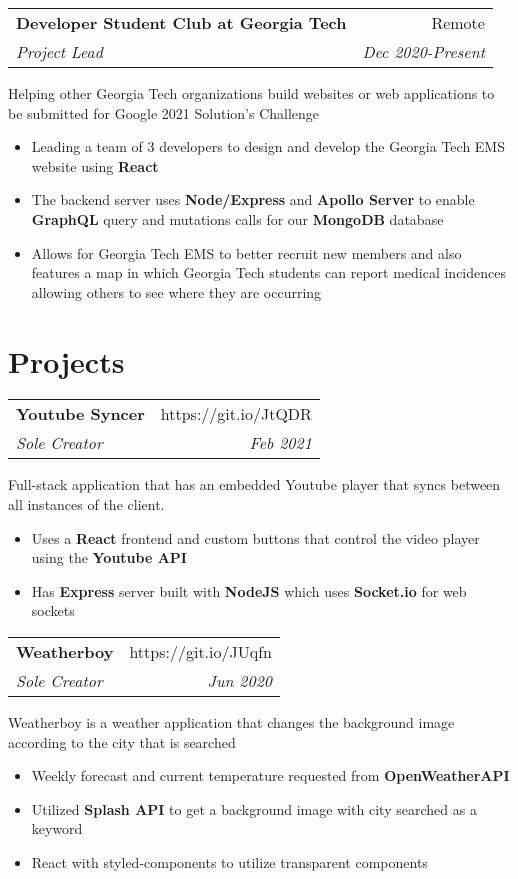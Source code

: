 \documentclass[letterpaper,8pt]{article}
\makeatletter
\newcommand{\resumeSubheading}[4]{
  \vspace{0.25em}
  \begin{tabular*}{1\textwidth}[t]{l@{\extracolsep{\fill}}r}
    \textbf{#1} & #2 \\
    \textit{#3} & \textit{#4} \\
  \end{tabular*}\vspace{-5pt}
}
\makeatother
\begin{document}
\resumeSubheading{Developer Student Club at Georgia Tech}{Remote}{Project Lead}{Dec 2020-Present}

Helping other Georgia Tech organizations build websites or web applications to be submitted for Google 2021 Solution's Challenge

\begin{itemize}[label=\raisebox{0.25ex}{\tiny$\bullet$}]
    \item Leading a team of 3 developers to design and develop the Georgia Tech EMS website using \textbf{React}
    \item The backend server uses \textbf{Node/Express} and \textbf{Apollo Server} to enable \textbf{GraphQL} query and mutations calls for our \textbf{MongoDB} database
    \item Allows for Georgia Tech EMS to better recruit new members and also features a map in which Georgia Tech students can report medical incidences allowing others to see where they are occurring
\end{itemize}
\vspace{3pt}


\section{Projects}

\resumeSubheading{Youtube Syncer}{https://git.io/JtQDR}{Sole Creator}{Feb 2021}

Full-stack application that has an embedded Youtube player that syncs between all instances of the client.

\begin{itemize}[label=\raisebox{0.25ex}{\tiny$\bullet$}]
    \item Uses a \textbf{React} frontend and custom buttons that control the video player using the \textbf{Youtube API}
    \item Has \textbf{Express} server built with \textbf{NodeJS} which uses \textbf{Socket.io} for web sockets
\end{itemize}
\vspace{3pt}

\resumeSubheading{Weatherboy}{https://git.io/JUqfn}{Sole Creator}{Jun 2020}

Weatherboy is a weather application that changes the background image according to the city that is searched

\begin{itemize}[label=\raisebox{0.25ex}{\tiny$\bullet$}]
  \item Weekly forecast and current temperature requested from \textbf{OpenWeatherAPI}
  \item Utilized \textbf{Splash API} to get a background image with city searched as a keyword
  \item React with styled-components to utilize transparent components
\end{itemize}
\vspace{3pt}
\end{document}
